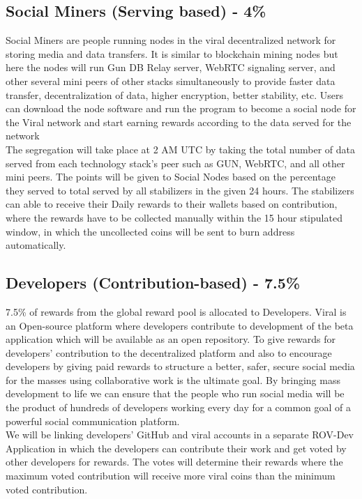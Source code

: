 \documentclass[10pt]{article}
\begin{document}
\subsection{Social Miners (Serving based) - 4\%}

Social Miners are people running nodes in the viral decentralized network for storing media and data transfers. It is similar to blockchain mining nodes but here the nodes will run Gun DB Relay server, WebRTC signaling server, and other several mini peers of other stacks simultaneously to provide faster data transfer, decentralization of data, higher encryption, better stability, etc. Users can download the node software and run the program to become a social node for the Viral network and start earning rewards according to the data served for the network\\

The segregation will take place at 2 AM UTC by taking the total number of data served from each technology stack's peer such as GUN, WebRTC, and all other mini peers. The points will be given to Social Nodes based on the percentage they served to total served by all stabilizers in the given 24 hours. The stabilizers can able to receive their Daily rewards to their wallets based on contribution, where the rewards have to be collected manually within the 15 hour stipulated window, in which the uncollected coins will be sent to burn address automatically.\\


\subsection{Developers (Contribution-based) - 7.5\%}

7.5\% of rewards from the global reward pool is allocated to Developers. Viral is an Open-source platform where developers contribute to development of the beta application which will be available as an open repository. To give rewards for developers' contribution to the decentralized platform and also to encourage developers by giving paid rewards to structure a better, safer, secure social media for the masses using collaborative work is the ultimate goal. By bringing mass development to life we can ensure that the people who run social media will be the product of hundreds of developers working every day for a common goal of a powerful social communication platform.\\

We will be linking developers' GitHub and viral accounts in a separate ROV-Dev Application in which the developers can contribute their work and get voted by other developers for rewards. The votes will determine their rewards where the maximum voted contribution will receive more viral coins than the minimum voted contribution.\\ 
\end{document}
